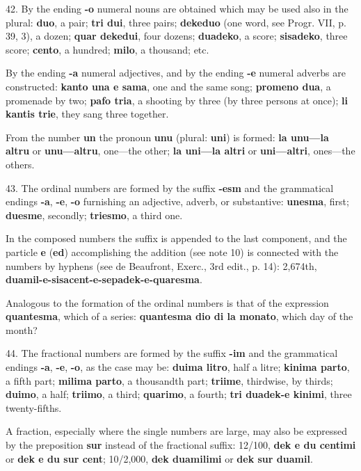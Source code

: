 42. By the ending \textbf{-o} numeral nouns are obtained which may be used also in the plural: \textbf{duo}, a pair; \textbf{tri dui}, three pairs; \textbf{dekeduo} (one word, see Progr. VII, p. 39, 3), a dozen; \textbf{quar dekedui}, four dozens; \textbf{duadeko}, a score; \textbf{sisadeko}, three score; \textbf{cento}, a hundred; \textbf{milo}, a thousand; etc. 

By the ending \textbf{-a} numeral adjectives, and by the ending \textbf{-e} numeral adverbs are constructed: \textbf{kanto una e sama}, one and the same song; \textbf{promeno dua}, a promenade by two; \textbf{pafo tria}, a shooting by three (by three persons at once); \textbf{li kantis trie}, they sang three together. 

From the number \textbf{un} the pronoun \textbf{unu} (plural: \textbf{uni}) is formed: \textbf{la unu—la altru} or \textbf{unu—altru}, one—the other; \textbf{la uni—la altri} or \textbf{uni—altri}, ones—the others. 

43. The ordinal numbers are formed by the suffix \textbf{-esm} and the grammatical endings \textbf{-a}, \textbf{-e}, \textbf{-o} furnishing an adjective, adverb, or substantive: \textbf{unesma}, first; \textbf{duesme}, secondly; \textbf{triesmo}, a third one. 

In the composed numbers the suffix is appended to the last component, and the particle \textbf{e} (\textbf{ed}) accomplishing the addition (see note 10) is connected with the numbers by hyphens (see de Beaufront, Exerc., 3rd edit., p. 14): 2,674th, \textbf{duamil-e-sisacent-e-sepadek-e-quaresma}. 

Analogous to the formation of the ordinal numbers is that of the expression \textbf{quantesma}, which of a series: \textbf{quantesma dio di la monato}, which day of the month? 

44. The fractional numbers are formed by the suffix \textbf{-im} and the grammatical endings \textbf{-a}, \textbf{-e}, \textbf{-o}, as the case may be: \textbf{duima litro}, half a litre; \textbf{kinima parto}, a fifth part; \textbf{milima parto}, a thousandth part; \textbf{triime}, thirdwise, by thirds; \textbf{duimo}, a half; \textbf{triimo}, a third; \textbf{quarimo}, a fourth; \textbf{tri duadek-e kinimi}, three twenty-fifths. 

A fraction, especially where the single numbers are large, may also be expressed by the preposition \textbf{sur} instead of the fractional suffix: 12/100, \textbf{dek e du centimi} or \textbf{dek e du sur cent}; 10/2,000, \textbf{dek duamilimi} or \textbf{dek sur duamil}. 

